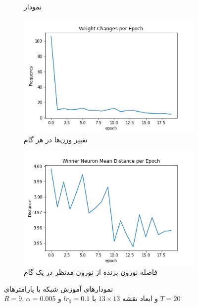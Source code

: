 \documentclass[12pt, a4paper]{article}
\begin{document}
\begin{figure}[h]
\begin{subfigure}{0.45\linewidth}
        \caption{نمودار }
    \end{subfigure}
    \newline
    \begin{subfigure}{0.45\linewidth}
        \includegraphics[width=\linewidth]{images/q5/r18/weight_change.png}
        \caption{تغییر وزن‌ها در هر گام}
    \end{subfigure}
    \hfill
    \begin{subfigure}{0.45\linewidth}
        \includegraphics[width=\linewidth]{images/q5/r18/winner_distance.png}
        \caption{فاصله نورون برنده از نورون مدنظر در یک گام}
    \end{subfigure}
    \caption{نمودار‌های آموزش شبکه  با پارامتر‌های \\$R=9$, $\alpha=0.005$ و ابعاد نقشه $13 \times 13$ با $lr_0=0.1$ و $T=20$}
    \label{r18}
\end{figure}
\end{document}
